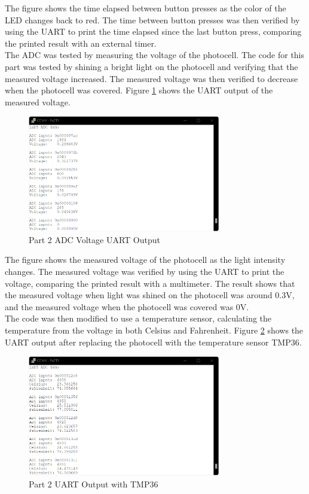 \documentclass[CMPE]{KGCOEReport}
\begin{document}
The figure shows the time elapsed between button presses as the color of the LED changes back to red. The time between button presses was then verified by using the UART to print the time elapsed since the last button press, comparing the printed result with an external timer.\\

The ADC was tested by measuring the voltage of the photocell. The code for this part was tested by shining a bright light on the photocell and verifying that the measured voltage increased. The measured voltage was then verified to decrease when the photocell was covered. Figure \ref{fig:part2a} shows the UART output of the measured voltage.

\begin{figure}[H]
    \centering
    \includegraphics[width=0.75\textwidth]{part2a.png}
    \caption{Part 2 ADC Voltage UART Output}
    \label{fig:part2a}
\end{figure}

The figure shows the measured voltage of the photocell as the light intensity changes. The measured voltage was verified by using the UART to print the voltage, comparing the printed result with a multimeter. The result shows that the measured voltage when light was shined on the photocell was around 0.3V, and the measured voltage when the photocell was covered was 0V.\\

The code was then modified to use a temperature sensor, calculating the temperature from the voltage in both Celsius and Fahrenheit. Figure \ref{fig:part2b} shows the UART output after replacing the photocell with the temperature sensor TMP36.

\begin{figure}[H]
    \centering
    \includegraphics[width=0.75\textwidth]{part2b.png}
    \caption{Part 2 UART Output with TMP36}
    \label{fig:part2b}
\end{figure}
\end{document}
